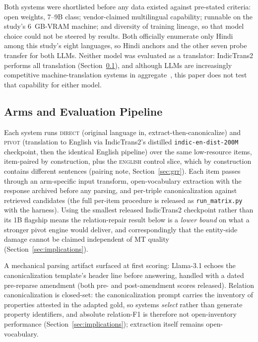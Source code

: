 \documentclass{llncs}
\begin{document}
Both systems were shortlisted before any data existed against pre-stated
criteria: open weights, 7--9B class; vendor-claimed multilingual
capability; runnable on the study's 6~GB-VRAM machine; and
diversity of training lineage, so that model choice could not be steered by
results. Both officially enumerate only Hindi among this study's eight
languages, so Hindi anchors and the other seven probe transfer for both
LLMs. Neither model was evaluated as a translator: IndicTrans2 performs all
translation (Section~\ref{sec:arms}), and although LLMs are increasingly
competitive machine-translation systems in
aggregate~\cite{deutsch2025wmt24pp}, this paper does not test that
capability for either model.

\subsection{Arms and Evaluation Pipeline}\label{sec:arms}
Each system runs \textsc{direct} (original language in,
extract-then-canonicalize) and \textsc{pivot} (translation to English via
IndicTrans2's distilled \texttt{indic-en-dist-200M} checkpoint, then the
identical English pipeline) over the same low-resource items, item-paired by
construction, plus the \textsc{english} control slice, which by construction
contains different sentences (pairing note, Section~\ref{sec:grr}). Each
item passes through an arm-specific input transform, open-vocabulary
extraction with the response archived before any parsing, and per-triple
canonicalization against retrieved candidates (the full per-item procedure
is released as \texttt{run\_matrix.py} with the harness). Using the smallest
released IndicTrans2 checkpoint rather than its 1B flagship means the
relation-repair result below is a \emph{lower bound} on what a stronger
pivot engine would deliver, and correspondingly that the entity-side damage
cannot be claimed independent of MT quality (Section~\ref{sec:implications}).

A mechanical parsing artifact surfaced at first scoring: Llama-3.1 echoes
the canonicalization template's header line before answering, handled with
a dated pre-reparse amendment (both pre- and post-amendment scores
released). Relation canonicalization is closed-set: the
canonicalization prompt carries the inventory of properties attested in the
adapted gold, so systems \emph{select} rather than generate property
identifiers, and absolute relation-F1 is therefore not open-inventory
performance (Section~\ref{sec:implications}); extraction itself remains
open-vocabulary.
\end{document}
